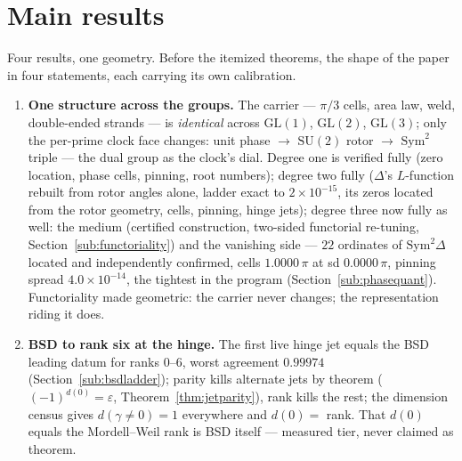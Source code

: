 \documentclass[11pt]{article}
\begin{document}
\tableofcontents

\section{Main results}\label{sec:contrib}

Four results, one geometry.  Before the itemized theorems, the shape of the paper in four
statements, each carrying its own calibration.

\begin{enumerate}[label=\textup{(\Roman*)}]
\item \textbf{One structure across the groups.}  The carrier --- $\pi/3$ cells, area law, weld,
double-ended strands --- is \emph{identical} across $\mathrm{GL}(1)$, $\mathrm{GL}(2)$,
$\mathrm{GL}(3)$; only the per-prime clock face changes: unit phase $\to$ $\mathrm{SU}(2)$ rotor
$\to$ $\mathrm{Sym}^2$ triple --- the dual group as the clock's dial.  Degree one is verified
fully (zero location, phase cells, pinning, root numbers); degree two fully ($\Delta$'s
$L$-function rebuilt from rotor angles alone, ladder exact to $2\times10^{-15}$, its zeros located
from the rotor geometry, cells, pinning, hinge jets); degree three now fully as well: the medium
(certified construction, two-sided functorial re-tuning, Section~\ref{sub:functoriality}) and the
vanishing side --- $22$ ordinates of $\mathrm{Sym}^2\Delta$ located and independently confirmed,
cells $1.0000\,\pi$ at sd $0.0000\,\pi$, pinning spread $4.0\times10^{-14}$, the tightest in the
program (Section~\ref{sub:phasequant}).  Functoriality made geometric: the
carrier never changes; the representation riding it does.

\item \textbf{BSD to rank six at the hinge.}  The first live hinge jet equals the BSD leading
datum for ranks $0$--$6$, worst agreement $0.99974$ (Section~\ref{sub:bsdladder}); parity kills
alternate jets by theorem ($(-1)^{d(0)}=\varepsilon$, Theorem~\ref{thm:jetparity}), rank kills the
rest; the dimension census gives $d(\gamma\neq0)=1$ everywhere and $d(0)=$ rank.  That $d(0)$
equals the Mordell--Weil rank is BSD itself --- measured tier, never claimed as theorem.


\end{enumerate}
\end{document}
